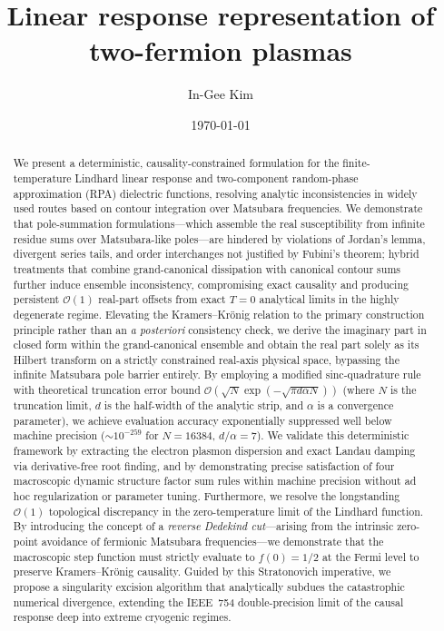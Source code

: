 \documentclass[aps,showkeys,noshowpacs,superscriptaddress,pre,preprint]{revtex4-2}
\begin{document}
\title{Linear response representation of two-fermion plasmas}
\author{In-Gee Kim}

\date{\today}

\begin{abstract}
We present a deterministic, causality-constrained formulation for the finite-temperature Lindhard linear response and two-component random-phase approximation (RPA) dielectric functions, resolving analytic inconsistencies in widely used routes based on contour integration over Matsubara frequencies. We demonstrate that pole-summation formulations---which assemble the real susceptibility from infinite residue sums over Matsubara-like poles---are hindered by violations of Jordan's lemma, divergent series tails, and order interchanges not justified by Fubini's theorem; hybrid treatments that combine grand-canonical dissipation with canonical contour sums further induce ensemble inconsistency, compromising exact causality and producing persistent $\mathcal{O}(1)$ real-part offsets from exact $T=0$ analytical limits in the highly degenerate regime. Elevating the Kramers--Kr\"onig relation to the primary construction principle rather than an \emph{a posteriori} consistency check, we derive the imaginary part in closed form within the grand-canonical ensemble and obtain the real part solely as its Hilbert transform on a strictly constrained real-axis physical space, bypassing the infinite Matsubara pole barrier entirely. By employing a modified sinc-quadrature rule with theoretical truncation error bound $\mathcal{O}(\sqrt{N} \exp(-\sqrt{\pi d \alpha N}))$ (where $N$ is the truncation limit, $d$ is the half-width of the analytic strip, and $\alpha$ is a convergence parameter), we achieve evaluation accuracy exponentially suppressed well below machine precision ($\sim 10^{-259}$ for $N=16384$, $d/\alpha=7$). We validate this deterministic framework by extracting the electron plasmon dispersion and exact Landau damping via derivative-free root finding, and by demonstrating precise satisfaction of four macroscopic dynamic structure factor sum rules within machine precision without ad hoc regularization or parameter tuning. Furthermore, we resolve the longstanding $\mathcal{O}(1)$ topological discrepancy in the zero-temperature limit of the Lindhard function. By introducing the concept of a \emph{reverse Dedekind cut}---arising from the intrinsic zero-point avoidance of fermionic Matsubara frequencies---we demonstrate that the macroscopic step function must strictly evaluate to $f(0)=1/2$ at the Fermi level to preserve Kramers--Kr\"onig causality. Guided by this Stratonovich imperative, we propose a singularity excision algorithm that analytically subdues the catastrophic numerical divergence, extending the IEEE~754 double-precision limit of the causal response deep into extreme cryogenic regimes.


\end{abstract}
\end{document}

